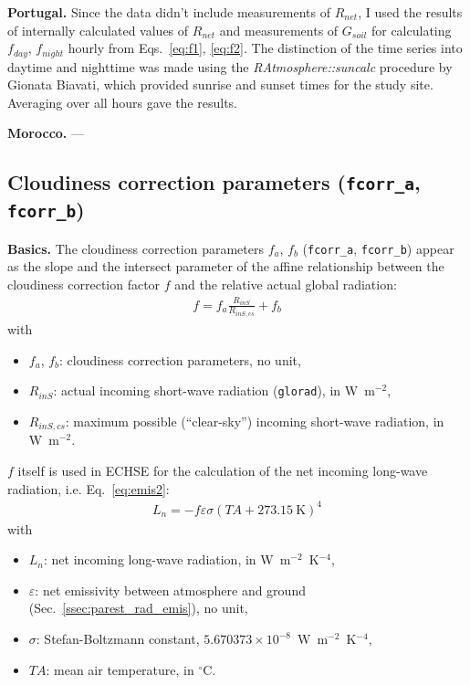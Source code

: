 \documentclass{scrreprt}
\newenvironment{denseitem}{
  \begin{itemize}
    \setlength{\itemsep}{0pt}
    \setlength{\parskip}{0pt}
    \setlength{\parsep}{0pt}
}{
  \end{itemize}
}
\begin{document}
\textbf{Portugal.}
Since the data didn't include measurements of $R_{net}$, I used the results of internally calculated values of $R_{net}$ and measurements of $G_{soil}$ for calculating $f_{day}$, $f_{night}$ hourly from Eqs.~\eqref{eq:f1}, \eqref{eq:f2}.
The distinction of the time series into daytime and nighttime was made using the \emph{RAtmosphere::suncalc} procedure by Gionata Biavati, which provided sunrise and sunset times for the study site.
Averaging over all hours gave the results.

\textbf{Morocco.}
---

\subsection{Cloudiness correction parameters (\texttt{fcorr\_a}, \texttt{fcorr\_b})} \label{ssec:parest_rad_fcorr}

\textbf{Basics.}
The cloudiness correction parameters $f_a$, $f_b$ (\verb!fcorr_a!, \verb!fcorr_b!) appear as the slope and the intersect parameter of the affine relationship between the cloudiness correction factor $f$ and the relative actual global radiation:
\begin{align} \label{eq:fcorr1}
  f = f_a \frac{R_{inS}}{R_{inS,cs}} + f_b
\end{align}
%
with
\begin{denseitem}
  \item[] $f_a$, $f_b$: cloudiness correction parameters, no unit,
  \item[] $R_{inS}$: actual incoming short-wave radiation (\verb!glorad!), in W~m$^{-2}$,
  \item[] $R_{inS,cs}$: maximum possible (``clear-sky'') incoming short-wave radiation, in W~m$^{-2}$.
\end{denseitem}
%
$f$ itself is used in ECHSE for the calculation of the net incoming long-wave radiation, i.e. Eq.~\eqref{eq:emis2}:
\begin{align*}
  L_n = -f \varepsilon \sigma (TA + 273.15~\text{K})^4
\end{align*}
%
with
\begin{denseitem}
  \item[] $L_n$: net incoming long-wave radiation, in W~m$^{-2}$~K$^{-4}$,
  \item[] $\varepsilon$: net emissivity between atmosphere and ground (Sec.~\ref{ssec:parest_rad_emis}), no unit,
  \item[] $\sigma$: Stefan-Boltzmann constant, $5.670373 \times 10^{-8}$~W~m$^{-2}$~K$^{-4}$,
  \item[] $TA$: mean air temperature, in $^\circ$C.
\end{denseitem}
\end{document}
